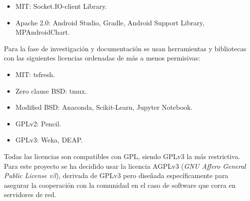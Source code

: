 \begin{itemize}
	\item MIT: Socket.IO-client Library. 
	\item Apache 2.0: Android Studio, Gradle, Android Support Library, MPAndroidChart. 
\end{itemize}

Para la fase de investigación y documentación se usan herramientas y bibliotecas con las siguientes licencias ordenadas de más a menos permisivas: 

\begin{itemize}
	\item MIT: tsfresh.
	\item Zero clause BSD: tmux. 
	\item Modified BSD: Anaconda, Scikit-Learn, Jupyter Notebook.  
	\item GPLv2: Pencil. 
	\item GPLv3: Weka, DEAP. 
\end{itemize}

Todas las licencias son compatibles con GPL, siendo GPLv3 la más restrictiva. Para este proyecto se ha decidido usar la licencia AGPLv3\cite{wiki:agpl} (\textit{GNU Affero General Public License v3}), derivada de GPLv3 pero diseñada específicamente para asegurar la cooperación con la comunidad en el caso de software que corra en servidores de red.





